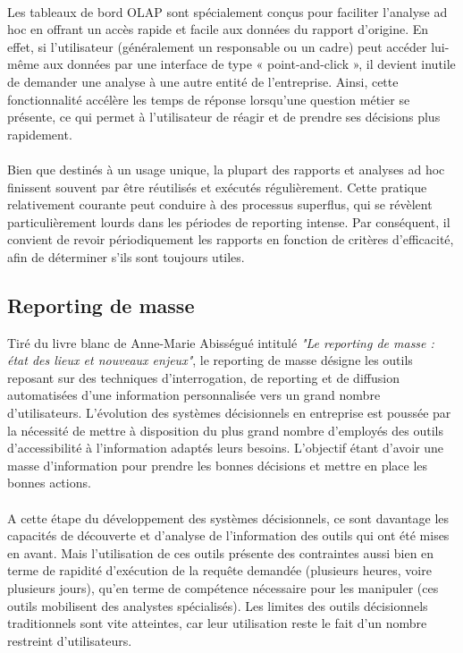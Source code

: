 \paragraph{}
Les tableaux de bord OLAP sont spécialement conçus pour faciliter l'analyse ad hoc en offrant un accès rapide et facile aux données du rapport d'origine. En effet, si l'utilisateur (généralement un responsable ou un cadre) peut accéder lui-même aux données par une interface de type « point-and-click », il devient inutile de demander une analyse à une autre entité de l'entreprise. Ainsi, cette fonctionnalité accélère les temps de réponse lorsqu'une question métier se présente, ce qui permet à l'utilisateur de réagir et de prendre ses décisions plus rapidement.
\paragraph{}
Bien que destinés à un usage unique, la plupart des rapports et analyses ad hoc finissent souvent par être réutilisés et exécutés régulièrement. Cette pratique relativement courante peut conduire à des processus superflus, qui se révèlent particulièrement lourds dans les périodes de reporting intense. Par conséquent, il convient de revoir périodiquement les rapports en fonction de critères d'efficacité, afin de déterminer s'ils sont toujours utiles.

\subsection{Reporting de masse}
Tiré du livre blanc de Anne-Marie Abisségué intitulé \textit{"Le reporting de masse : état des lieux et nouveaux enjeux"}, le reporting de masse désigne les outils reposant sur des techniques d'interrogation, de reporting et de diffusion automatisées d'une information personnalisée vers un grand nombre d'utilisateurs. L'évolution des systèmes décisionnels en entreprise est poussée par la nécessité de mettre à disposition du plus grand nombre d’employés des outils d’accessibilité à l’information adaptés leurs besoins. L'objectif étant d'avoir une masse d’information pour prendre les bonnes décisions et mettre en place les bonnes actions.
\paragraph{}
A cette étape du développement des systèmes décisionnels, ce sont davantage les capacités de découverte et d'analyse de l'information des outils qui ont été mises en avant. Mais l'utilisation de ces outils présente des contraintes aussi bien en terme de rapidité d'exécution de la requête demandée (plusieurs heures, voire plusieurs jours), qu'en terme de compétence nécessaire pour les manipuler (ces outils mobilisent des analystes spécialisés). Les limites des outils décisionnels traditionnels sont vite atteintes, car leur utilisation reste le fait d'un nombre restreint d'utilisateurs.

